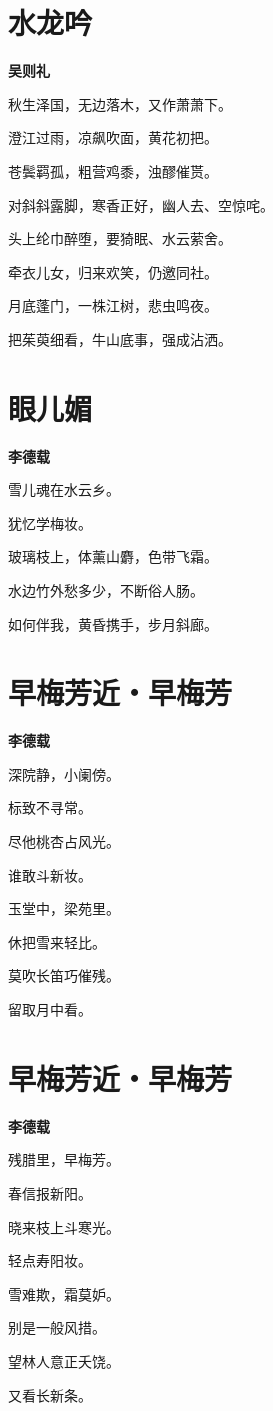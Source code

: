 \documentclass[12pt,a4paper]{ctexbook}
\begin{document}
\section{水龙吟}
\textbf{吴则礼}\par\vspace{0.5em}
秋生泽国，无边落木，又作萧萧下。\par
澄江过雨，凉飙吹面，黄花初把。\par
苍鬓羁孤，粗营鸡黍，浊醪催贳。\par
对斜斜露脚，寒香正好，幽人去、空惊咤。\par
头上纶巾醉堕，要猗眠、水云萦舍。\par
牵衣儿女，归来欢笑，仍邀同社。\par
月底蓬门，一株江树，悲虫鸣夜。\par
把茱萸细看，牛山底事，强成沾洒。\par

\section{眼儿媚}
\textbf{李德载}\par\vspace{0.5em}
雪儿魂在水云乡。\par
犹忆学梅妆。\par
玻璃枝上，体薰山麝，色带飞霜。\par
水边竹外愁多少，不断俗人肠。\par
如何伴我，黄昏携手，步月斜廊。\par

\section{早梅芳近・早梅芳}
\textbf{李德载}\par\vspace{0.5em}
深院静，小阑傍。\par
标致不寻常。\par
尽他桃杏占风光。\par
谁敢斗新妆。\par
玉堂中，梁苑里。\par
休把雪来轻比。\par
莫吹长笛巧催残。\par
留取月中看。\par

\section{早梅芳近・早梅芳}
\textbf{李德载}\par\vspace{0.5em}
残腊里，早梅芳。\par
春信报新阳。\par
晓来枝上斗寒光。\par
轻点寿阳妆。\par
雪难欺，霜莫妒。\par
别是一般风措。\par
望林人意正夭饶。\par
又看长新条。\par
\end{document}
